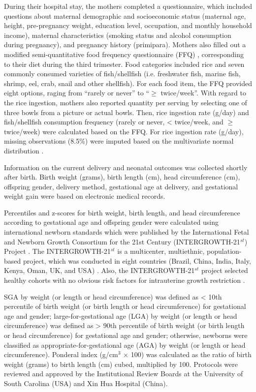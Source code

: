 During their hospital stay, the mothers completed a questionnaire, which included questions about maternal demographic and socioeconomic status (maternal age, height, pre-pregnancy weight, education level, occupation, and monthly household income), maternal characteristics (smoking status and alcohol consumption during pregnancy), and pregnancy history (primipara). Mothers also filled out a modified semi-quantitative food frequency questionnaire (FFQ) \cite{cheng2009assessment}, corresponding to their diet during the third trimester. Food categories included rice and seven commonly consumed
varieties of fish/shellfish (i.e. freshwater fish, marine fish, shrimp, eel, crab, snail and other shellfish). For each food item, the FFQ provided eight options, raging from ``rarely or never'' to ``${\ge}$ twice/week''. With regard to the rice ingestion, mothers also reported quantity per serving by selecting one of three bowls from a picture or actual bowls. Then, rice ingestion rate (g/day) and fish/shellfish consumption frequency (rarely or never, < twice/week, and ${\ge}$ twice/week) were calculated based on the FFQ. For rice ingestion rate (g/day), missing observations (8.5\%) were imputed based on the multivariate normal distribution \cite{schafer1997analysis}.

Information on the current delivery and neonatal outcomes was collected shortly after birth. Birth weight (grams), birth length (cm), head circumference (cm), offspring gender, delivery method, gestational age at delivery, and gestational weight gain were based on electronic medical records.

Percentiles and z-scores for birth weight, birth length, and head circumference according to gestational age and offspring gender were calculated using international newborn standards which were published by the International Fetal and Newborn Growth Consortium for the 21st Century (INTERGROWTH-21$^{st}$) Project \cite{villar2014international}. The INTERGROWTH-21$^{st}$ is a multicenter, multiethnic, population-based project, which was conducted in eight countries (Brazil, China, India, Italy, Kenya, Oman, UK, and USA) \citep{villar2013objectives}. Also, the INTERGROWTH-21$^{st}$ project selected healthy cohorts with no obvious risk factors for intrauterine growth restriction \citep{villar2013objectives}.

SGA by weight (or length or head circumference) was defined as < 10th percentile of birth weight (or birth length or head circumference) for gestational age and gender; large-for-gestational age (LGA) by weight (or length or head circumference) was defined as > 90th percentile of birth weight (or birth length or head circumference) for gestational age and gender; otherwise, newborns were classified as appropriate-for-gestational age (AGA) by weight (or length or head circumference). Ponderal index (g/cm$^{3}$ \({\times}\) 100) was calculated as the ratio of birth weight (grams) to birth length (cm) cubed, multiplied by 100. Protocols were reviewed and approved by the Institutional Review Boards at the University of South Carolina (USA) and Xin Hua Hospital (China).

